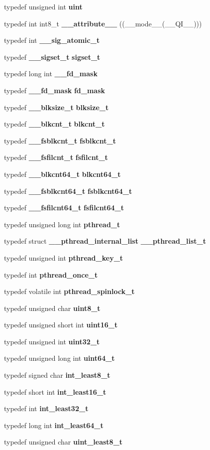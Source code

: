 \begin{DoxyCompactItemize}
\item 
typedef unsigned int {\bf uint}
\item 
typedef int int8\_\-t {\bf \_\-\_\-attribute\_\-\_\-} ((\_\-\_\-mode\_\-\_\-(\_\-\_\-QI\_\-\_\-)))
\item 
typedef int {\bf \_\-\_\-sig\_\-atomic\_\-t}
\item 
typedef {\bf \_\-\_\-sigset\_\-t} {\bf sigset\_\-t}
\item 
typedef long int {\bf \_\-\_\-fd\_\-mask}
\item 
typedef {\bf \_\-\_\-fd\_\-mask} {\bf fd\_\-mask}
\item 
typedef {\bf \_\-\_\-blksize\_\-t} {\bf blksize\_\-t}
\item 
typedef {\bf \_\-\_\-blkcnt\_\-t} {\bf blkcnt\_\-t}
\item 
typedef {\bf \_\-\_\-fsblkcnt\_\-t} {\bf fsblkcnt\_\-t}
\item 
typedef {\bf \_\-\_\-fsfilcnt\_\-t} {\bf fsfilcnt\_\-t}
\item 
typedef {\bf \_\-\_\-blkcnt64\_\-t} {\bf blkcnt64\_\-t}
\item 
typedef {\bf \_\-\_\-fsblkcnt64\_\-t} {\bf fsblkcnt64\_\-t}
\item 
typedef {\bf \_\-\_\-fsfilcnt64\_\-t} {\bf fsfilcnt64\_\-t}
\item 
typedef unsigned long int {\bf pthread\_\-t}
\item 
typedef struct {\bf \_\-\_\-pthread\_\-internal\_\-list} {\bf \_\-\_\-pthread\_\-list\_\-t}
\item 
typedef unsigned int {\bf pthread\_\-key\_\-t}
\item 
typedef int {\bf pthread\_\-once\_\-t}
\item 
typedef volatile int {\bf pthread\_\-spinlock\_\-t}
\item 
typedef unsigned char {\bf uint8\_\-t}
\item 
typedef unsigned short int {\bf uint16\_\-t}
\item 
typedef unsigned int {\bf uint32\_\-t}
\item 
typedef unsigned long int {\bf uint64\_\-t}
\item 
typedef signed char {\bf int\_\-least8\_\-t}
\item 
typedef short int {\bf int\_\-least16\_\-t}
\item 
typedef int {\bf int\_\-least32\_\-t}
\item 
typedef long int {\bf int\_\-least64\_\-t}
\item 
typedef unsigned char {\bf uint\_\-least8\_\-t}

\end{DoxyCompactItemize}
